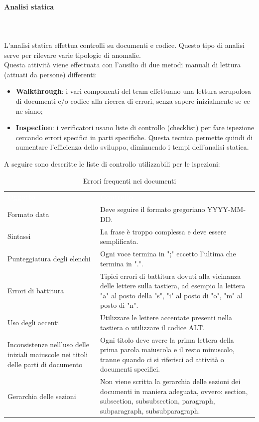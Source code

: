 \paragraph{Analisi statica} \mbox{} \\ \mbox{} \\
L'analisi statica effettua controlli su documenti e codice. Questo tipo di analisi serve per rilevare varie tipologie di anomalie. \\
Questa attività viene effettuata con l'ausilio di due metodi manuali di lettura (attuati da persone) differenti: \begin{itemize}
\item \textbf{Walkthrough}: i vari componenti del team effettuano una lettura scrupolosa di documenti e/o codice alla ricerca di errori, senza sapere inizialmente se ce ne siano;
\item \textbf{Inspection}: i verificatori usano liste di controllo (checklist) per fare ispezione cercando errori specifici in parti specifiche. Questa tecnica permette quindi di aumentare l'efficienza dello sviluppo, diminuendo i tempi dell'analisi statica.
\end{itemize}
A seguire sono descritte le liste di controllo utilizzabili per le ispezioni:
\begin{table}[H]
\caption{Errori frequenti nei documenti}
\begin{center}
\begin{tabular}{C{4.5cm} C{11cm}}
\textcolor{white}{\textbf{Oggetto}} & \centerline{\textcolor{white}{\textbf{Controllo}}} \\
Formato data & Deve seguire il formato gregoriano YYYY-MM-DD. \\
Sintassi & La frase è troppo complessa e deve essere semplificata. \\
Punteggiatura degli elenchi & Ogni voce termina in ";" eccetto l'ultima che termina in ".".\\
Errori di battitura & Tipici errori di battitura dovuti alla vicinanza delle
lettere sulla tastiera, ad esempio la lettera "a" al posto della "s", "i" al posto di "o", "m" al posto di "n". \\
Uso degli accenti & Utilizzare le lettere accentate presenti nella tastiera o utilizzare il codice ALT. \\
Inconsistenze nell’uso delle iniziali maiuscole nei titoli delle parti di documento & Ogni titolo deve avere la prima lettera della prima parola maiuscola e il resto minuscolo, tranne quando ci si riferisci ad attività o documenti specifici. \\
Gerarchia delle sezioni & Non viene scritta la gerarchia delle sezioni dei documenti in maniera adeguata, ovvero: section, subsection, subsubsection, paragraph, subparagraph, subsubparagraph. \\
\end{tabular}
\end{center}
\end{table}

